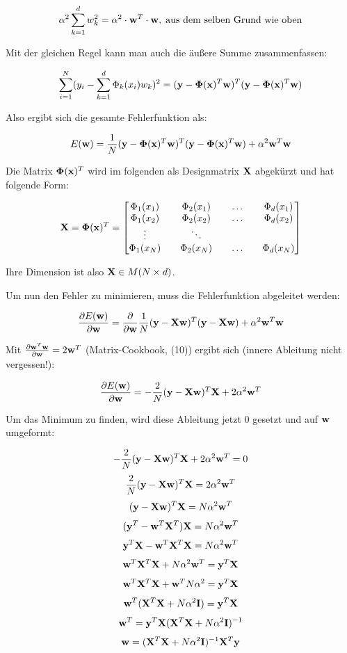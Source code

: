 $$ \alpha^2 \sum_{k=1}^d w_k^2 = \alpha^2 \cdot \mathbf{w}^T \cdot \mathbf{w}, \; \text{aus dem selben Grund wie oben} $$

Mit der gleichen Regel kann man auch die äußere Summe zusammenfassen:

$$ \sum_{i=1}^N (y_i - \sum_{k=1}^{d} \Phi_k(x_i) w_k)^2 = (\mathbf{y} - \mathbf{\Phi}(\mathbf{x})^T \mathbf{w})^T (\mathbf{y} - \mathbf{\Phi}(\mathbf{x})^T \mathbf{w}) $$

Also ergibt sich die gesamte Fehlerfunktion als:

$$ E(\mathbf{w}) = \frac{1}{N} (\mathbf{y} - \mathbf{\Phi}(\mathbf{x})^T \mathbf{w})^T (\mathbf{y} - \mathbf{\Phi}(\mathbf{x})^T \mathbf{w}) + \alpha^2 \mathbf{w}^T \mathbf{w} $$

Die Matrix $ \mathbf{\Phi}(\mathbf{x})^T $ wird im folgenden als Designmatrix $ \mathbf{X} $ abgekürzt und hat folgende Form:

$$ \mathbf{X} = \mathbf{\Phi}(\mathbf{x})^T = \begin{bmatrix} \Phi_1(x_1) && \Phi_2(x_1) && \hdots && \Phi_d(x_1) \\  \Phi_1(x_2) && \Phi_2(x_2) && \hdots && \Phi_d(x_2) \\ \vdots && \ddots \\ \Phi_1(x_N) && \Phi_2(x_N) && \hdots && \Phi_d(x_N) \end{bmatrix} $$

Ihre Dimension ist also $ \mathbf{X} \in M(N \times d) $.

Um nun den Fehler zu minimieren, muss die Fehlerfunktion abgeleitet werden:

$$ \frac{\partial E(\mathbf{w})}{\partial \mathbf{w}} = \frac{\partial}{\partial \mathbf{w}} \frac{1}{N} (\mathbf{y} - \mathbf{X} \mathbf{w})^T (\mathbf{y} - \mathbf{X} \mathbf{w}) + \alpha^2 \mathbf{w}^T \mathbf{w} $$

Mit $ \frac{\partial \mathbf{w}^T \mathbf{w}}{\partial \mathbf{w}} = 2 \mathbf{w}^T $ (Matrix-Cookbook, (10)) ergibt sich (innere Ableitung nicht vergessen!):

$$ \frac{\partial E(\mathbf{w})}{\partial \mathbf{w}} = - \frac{2}{N} (\mathbf{y} - \mathbf{X} \mathbf{w})^T \mathbf{X} + 2 \alpha^2 \mathbf{w}^T $$

Um das Minimum zu finden, wird diese Ableitung jetzt 0 gesetzt und auf $\mathbf{w}$ umgeformt:

$$ - \frac{2}{N} (\mathbf{y} - \mathbf{X} \mathbf{w})^T \mathbf{X} + 2 \alpha^2 \mathbf{w}^T = 0 $$
$$ \frac{2}{N} (\mathbf{y} - \mathbf{X} \mathbf{w})^T \mathbf{X} = 2 \alpha^2 \mathbf{w}^T $$
$$ (\mathbf{y} - \mathbf{X} \mathbf{w})^T \mathbf{X} = N \alpha^2 \mathbf{w}^T $$
$$ (\mathbf{y}^T - \mathbf{w}^T \mathbf{X}^T) \mathbf{X} = N \alpha^2 \mathbf{w}^T $$
$$ \mathbf{y}^T \mathbf{X} - \mathbf{w}^T \mathbf{X}^T \mathbf{X} = N \alpha^2 \mathbf{w}^T $$
$$ \mathbf{w}^T \mathbf{X}^T \mathbf{X} + N \alpha^2 \mathbf{w}^T = \mathbf{y}^T \mathbf{X} $$
$$ \mathbf{w}^T \mathbf{X}^T \mathbf{X} + \mathbf{w}^T N \alpha^2 = \mathbf{y}^T \mathbf{X} $$
$$ \mathbf{w}^T (\mathbf{X}^T \mathbf{X} + N \alpha^2 \mathbf{I}) = \mathbf{y}^T \mathbf{X} $$
$$ \mathbf{w}^T = \mathbf{y}^T \mathbf{X} (\mathbf{X}^T \mathbf{X} + N \alpha^2 \mathbf{I})^{-1} $$
$$ \mathbf{w} = (\mathbf{X}^T \mathbf{X} + N \alpha^2 \mathbf{I})^{-1} \mathbf{X}^T \mathbf{y} $$


